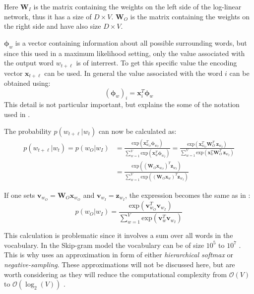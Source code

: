 Here $\mathbf{W}_I$ is the matrix containing the weights on the left side of the log-linear network, thus it has a size of $D \times V$. $\mathbf{W}_O$ is the matrix containing the weights on the right side and have also size $D \times V$.

$\boldsymbol\phi_w$ is a vector containing information about all possible surrounding words, but since this used in a maximum likelihood setting, only the value associated with the output word $w_{t + \ell}$ is of interrest. To get this specific value the encoding vector $\mathbf{x}_{t + \ell}$ can be used. In general the value associated with the word $i$ can be obtained using:
\begin{equation}
\left(\boldsymbol\phi_w\right)_i = \mathbf{x}_{i}^T \boldsymbol\phi_w
\end{equation}
This detail is not particular important, but explains the some of the notation used in \cite{word2vec-details}.

The probability $p(w_{t + \ell} | w_t)$ can now be calculated as:
\begin{equation}
\begin{aligned}
p(w_{t + \ell} | w_t) = p(w_O | w_I) &= \frac{
	\mathrm{exp}(\mathbf{x}^T_{w_O} \boldsymbol\phi_{w_I} )
}{
	\sum_{w=1}^V \mathrm{exp}(\mathbf{x}^T_{w} \boldsymbol\phi_{w_I})
} = \frac{
	\mathrm{exp}(\mathbf{x}^T_{w_O} \mathbf{W}_O^T\ \mathbf{z}_{w_I} )
}{
	\sum_{w=1}^V \mathrm{exp}(\mathbf{x}^T_{w} \mathbf{W}_O^T\ \mathbf{z}_{w_I})
}
\\
&= \frac{
	\mathrm{exp}( \left( \mathbf{W}_O \mathbf{x}_{w_O} \right)^T \mathbf{z}_{w_I} )
}{
	\sum_{w=1}^V \mathrm{exp}( \left( \mathbf{W}_O \mathbf{x}_{w} \right)^T \mathbf{z}_{w_I})
}
\end{aligned}
\end{equation}

If one sets $\mathbf{v}_{w_O} = \mathbf{W}_O \mathbf{x}_{w_O}$ and $\mathbf{v}_{w_I} = \mathbf{z}_{w_I}$, the expression becomes the same as in \cite[eq. 2]{word2vec-details}: 
\begin{equation}
p(w_O | w_I) = \frac{
	\mathrm{exp}( \mathbf{v}_{w_O}^T \mathbf{v}_{w_I} )
}{
	\sum_{w=1}^V \mathrm{exp}( \mathbf{v}_{w}^T \mathbf{v}_{w_I} )
}
\end{equation}

This calculation is problematic since it involves a sum over all words in the vocabulary. In the Skip-gram model the vocabulary can be of size $10^5$ to $10^7$ \cite{word2vec-details}. This is why \cite{word2vec-comparing, word2vec-details, word2vec-explained} uses an approximation in form of either \textit{hierarchical softmax} or \textit{negative-sampling}. These approximations will not be discussed here, but are worth considering as they will reduce the computational complexity from $\mathcal{O}(V)$ to $\mathcal{O}(\log_2(V))$ \cite{word2vec-comparing}.
